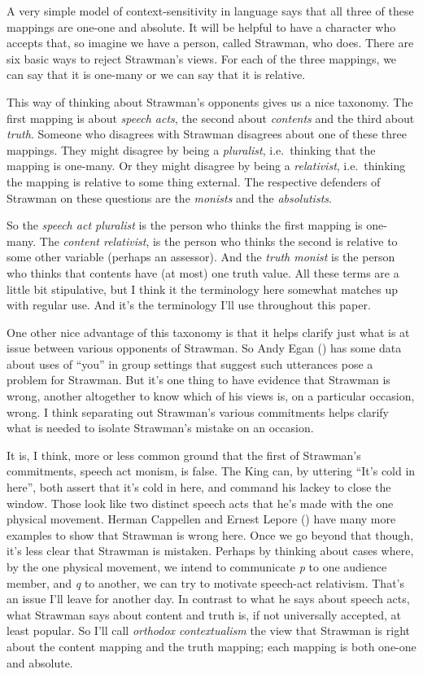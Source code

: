 \documentclass[
  11pt,
  letterpaper,
  DIV=11,
  numbers=noendperiod,
  twoside]{scrartcl}
\begin{document}
A very simple model of context-sensitivity in language says that all
three of these mappings are one-one and absolute. It will be helpful to
have a character who accepts that, so imagine we have a person, called
Strawman, who does. There are six basic ways to reject Strawman's views.
For each of the three mappings, we can say that it is one-many or we can
say that it is relative.

This way of thinking about Strawman's opponents gives us a nice
taxonomy. The first mapping is about \emph{speech acts}, the second
about \emph{contents} and the third about \emph{truth}. Someone who
disagrees with Strawman disagrees about one of these three mappings.
They might disagree by being a \emph{pluralist}, i.e.~thinking that the
mapping is one-many. Or they might disagree by being a
\emph{relativist}, i.e.~thinking the mapping is relative to some thing
external. The respective defenders of Strawman on these questions are
the \emph{monists} and the \emph{absolutists}.

So the \emph{speech act pluralist} is the person who thinks the first
mapping is one-many. The \emph{content relativist}, is the person who
thinks the second is relative to some other variable (perhaps an
assessor). And the \emph{truth monist} is the person who thinks that
contents have (at most) one truth value. All these terms are a little
bit stipulative, but I think it the terminology here somewhat matches up
with regular use. And it's the terminology I'll use throughout this
paper.

One other nice advantage of this taxonomy is that it helps clarify just
what is at issue between various opponents of Strawman. So Andy Egan
() has some data about uses of
``you'' in group settings that suggest such utterances pose a problem
for Strawman. But it's one thing to have evidence that Strawman is
wrong, another altogether to know which of his views is, on a particular
occasion, wrong. I think separating out Strawman's various commitments
helps clarify what is needed to isolate Strawman's mistake on an
occasion.

It is, I think, more or less common ground that the first of Strawman's
commitments, speech act monism, is false. The King can, by uttering
``It's cold in here'', both assert that it's cold in here, and command
his lackey to close the window. Those look like two distinct speech acts
that he's made with the one physical movement. Herman Cappellen and
Ernest Lepore ()
have many more examples to show that Strawman is wrong here. Once we go
beyond that though, it's less clear that Strawman is mistaken. Perhaps
by thinking about cases where, by the one physical movement, we intend
to communicate \emph{p} to one audience member, and \emph{q} to another,
we can try to motivate speech-act relativism. That's an issue I'll leave
for another day. In contrast to what he says about speech acts, what
Strawman says about content and truth is, if not universally accepted,
at least popular. So I'll call \emph{orthodox contextualism} the view
that Strawman is right about the content mapping and the truth mapping;
each mapping is both one-one and absolute.
\end{document}
